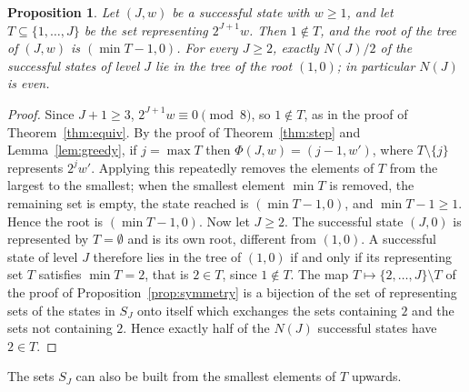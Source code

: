 \documentclass[11pt]{amsart}
\newtheorem{Proposition}[Theorem]{Proposition}
\theoremstyle{definition}
\begin{document}
\begin{Proposition}
\label{prop:roots}
Let $(J,w)$ be a successful state with $w\ge1$, and let $T\subseteq\{1,\dots,J\}$ be the set representing $2^{J+1}w$. Then $1\notin T$, and the root of the tree of $(J,w)$ is $(\min T-1,0)$. For every $J\ge2$, exactly $N(J)/2$ of the successful states of level $J$ lie in the tree of the root $(1,0)$; in particular $N(J)$ is even.
\end{Proposition}
\begin{proof}
Since $J+1\ge3$, $2^{J+1}w\equiv0\pmod8$, so $1\notin T$, as in the proof of Theorem~\ref{thm:equiv}. By the proof of Theorem~\ref{thm:step} and Lemma~\ref{lem:greedy}, if $j=\max T$ then $\Phi(J,w)=(j-1,w')$, where $T\setminus\{j\}$ represents $2^{j}w'$. Applying this repeatedly removes the elements of $T$ from the largest to the smallest; when the smallest element $\min T$ is removed, the remaining set is empty, the state reached is $(\min T-1,0)$, and $\min T-1\ge1$. Hence the root is $(\min T-1,0)$. Now let $J\ge2$. The successful state $(J,0)$ is represented by $T=\emptyset$ and is its own root, different from $(1,0)$. A successful state of level $J$ therefore lies in the tree of $(1,0)$ if and only if its representing set $T$ satisfies $\min T=2$, that is $2\in T$, since $1\notin T$. The map $T\mapsto\{2,\dots,J\}\setminus T$ of the proof of Proposition~\ref{prop:symmetry} is a bijection of the set of representing sets of the states in $S_J$ onto itself which exchanges the sets containing $2$ and the sets not containing $2$. Hence exactly half of the $N(J)$ successful states have $2\in T$.
\end{proof}

The sets $S_J$ can also be built from the smallest elements of $T$ upwards.
\end{document}

